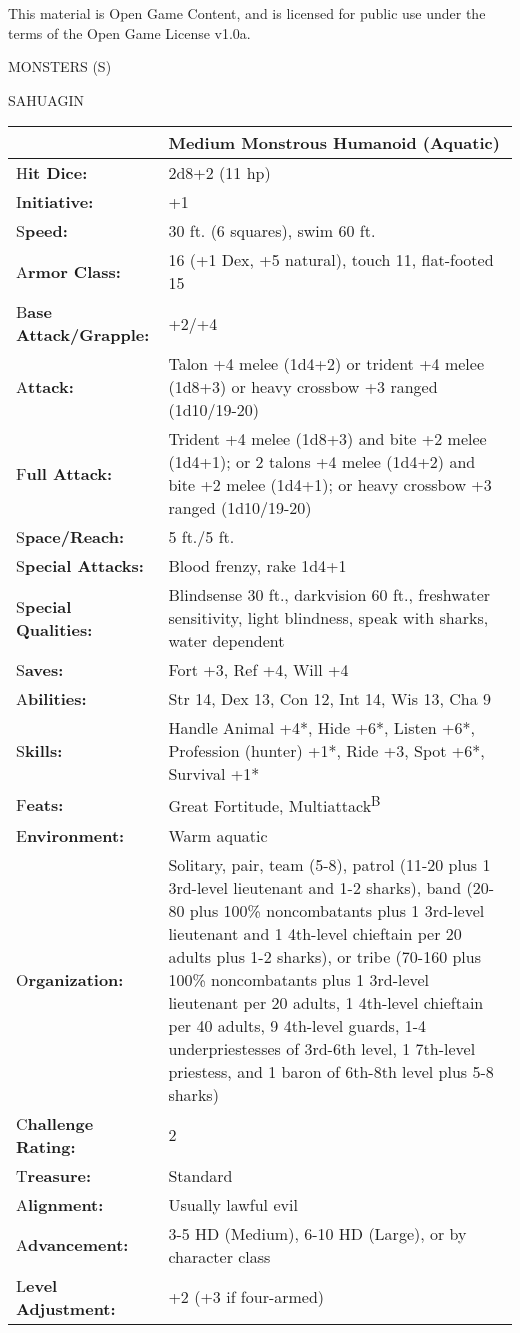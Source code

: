 \documentclass{article}
\begin{document}
This material is Open Game Content, and is licensed for public use under the terms 
of the Open Game License v1.0a.

{\LARGE{}MONSTERS (S)}

\vspace{12pt}
{\LARGE{}SAHUAGIN}

\begin{tabular}{|>{\raggedright}p{91pt}|>{\raggedright}p{212pt}|}
\hline
  & Medium Monstrous Humanoid (Aquatic)\tabularnewline
\hline
H\textbf{it Dice:} & 2d8+2 (11 hp)\tabularnewline
\hline
I\textbf{nitiative:} & +1\tabularnewline
\hline
S\textbf{peed:} & 30 ft. (6 squares), swim 60 ft.\tabularnewline
\hline
A\textbf{rmor Class:} & 16 (+1 Dex, +5 natural), touch 11, flat-footed 15\tabularnewline
\hline
B\textbf{ase Attack/Grapple:} & +2/+4\tabularnewline
\hline
A\textbf{ttack:} & Talon +4 melee (1d4+2) or trident +4 melee (1d8+3) or heavy 
crossbow +3 ranged (1d10/19-20)\tabularnewline
\hline
F\textbf{ull Attack:} & Trident +4 melee (1d8+3) and bite +2 melee (1d4+1); or 
2 talons +4 melee (1d4+2) and bite +2 melee (1d4+1); or heavy crossbow +3 ranged 
(1d10/19-20)\tabularnewline
\hline
S\textbf{pace/Reach:} & 5 ft./5 ft.\tabularnewline
\hline
S\textbf{pecial Attacks:} & Blood frenzy, rake 1d4+1\tabularnewline
\hline
S\textbf{pecial Qualities:} & Blindsense 30 ft., darkvision 60 ft., freshwater 
sensitivity, light blindness, speak with sharks, water dependent\tabularnewline
\hline
S\textbf{aves:} & Fort +3, Ref +4, Will +4\tabularnewline
\hline
A\textbf{bilities:} & Str 14, Dex 13, Con 12, Int 14, Wis 13, Cha 9\tabularnewline
\hline
S\textbf{kills:} & Handle Animal +4*, Hide +6*, Listen +6*, Profession (hunter) 
+1*, Ride +3, Spot +6*, Survival +1*\tabularnewline
\hline
F\textbf{eats:} & Great Fortitude, Multiattack\textsuperscript{B}\tabularnewline
\hline
E\textbf{nvironment:} & Warm aquatic\tabularnewline
\hline
O\textbf{rganization:} & Solitary, pair, team (5-8), patrol (11-20 plus 1 3rd-level 
lieutenant and 1-2 sharks), band (20-80 plus 100\% noncombatants plus 1 3rd-level 
lieutenant and 1 4th-level chieftain per 20 adults plus 1-2 sharks), or tribe (70-160 
plus 100\% noncombatants plus 1 3rd-level lieutenant per 20 adults, 1 4th-level 
chieftain per 40 adults, 9 4th-level guards, 1-4 underpriestesses of 3rd-6th level, 
1 7th-level priestess, and 1 baron of 6th-8th level plus 5-8 sharks)\tabularnewline
\hline
C\textbf{hallenge Rating:} & 2\tabularnewline
\hline
T\textbf{reasure:} & Standard\tabularnewline
\hline
A\textbf{lignment:} & Usually lawful evil\tabularnewline
\hline
A\textbf{dvancement:} & 3-5 HD (Medium), 6-10 HD (Large), or by character class\tabularnewline
\hline
L\textbf{evel Adjustment:} & +2 (+3 if four-armed)\tabularnewline
\hline
\end{tabular}
\end{document}
